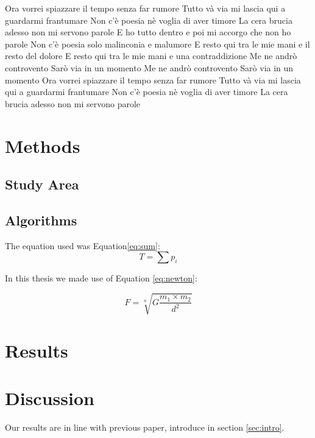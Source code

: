 Ora vorrei spiazzare il tempo senza far rumore
Tutto và via mi lascia qui a guardarmi frantumare
Non c'è poesia nè voglia di aver timore
La cera brucia adesso non mi servono parole
E ho tutto dentro e poi mi accorgo che non ho parole
Non c'è poesia solo malinconia e malumore
E resto qui tra le mie mani e il resto del dolore
E resto qui tra le mie mani e una contraddizione
Me ne andrò controvento
Sarò via in un momento
Me ne andrò controvento
Sarò via in un momento
Ora vorrei spiazzare il tempo senza far rumore
Tutto và via mi lascia qui a guardarmi frantumare
Non c'è poesia nè voglia di aver timore
La cera brucia adesso non mi servono parole

\section{Methods}
\subsection{Study Area}
\subsection{Algorithms}
The equation used was Equation\ref{eq:sum}: 
\begin{equation}
    T = \sum p_i
    \label{eq:sum}
\end{equation}

In this thesis we made use of Equation \ref{eq:newton}:

\begin{equation}
    F=\sqrt[n]{G \frac{m_1 \times m_2}{d^2}}
    \label{eq:newton}
\end{equation}

\section{Results}


\section{Discussion}

Our results are in line with previous paper, introduce in section \ref{sec:intro}.


